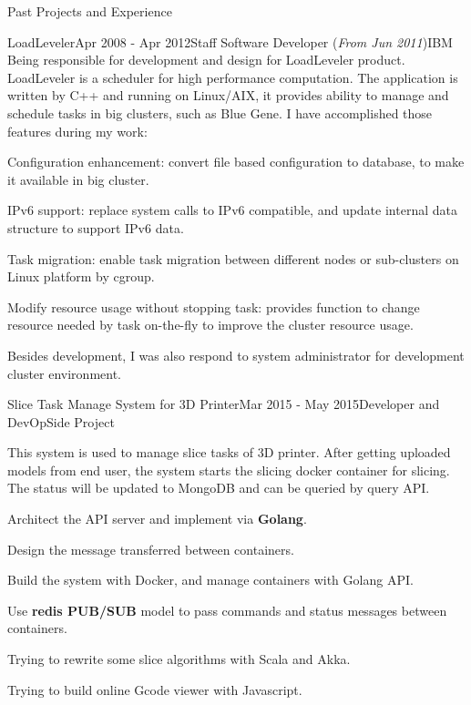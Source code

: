 \documentclass{resume} %
\begin{document}
\begin{rSection}{Past Projects and Experience}
\begin{rSubsection}{LoadLeveler}{Apr 2008 - Apr 2012}{Staff Software Developer (\textit{From Jun 2011})}{IBM}
Being responsible for development and design for LoadLeveler product. LoadLeveler is a scheduler for high performance computation. The application is written by C++ and running on Linux/AIX, it provides ability to manage and schedule tasks in big clusters, such as Blue Gene. I have accomplished those features during my work:

\begin{rSubsectionList}
\item Configuration enhancement: convert file based configuration to database, to make it available in big cluster.
\item IPv6 support: replace system calls to IPv6 compatible, and update internal data structure to support IPv6 data.
\item Task migration: enable task migration between different nodes or sub-clusters on Linux platform by cgroup.
\item Modify resource usage without stopping task: provides function to change resource needed by task on-the-fly to improve the cluster resource usage.
\end{rSubsectionList}\vspace{-1.5em}

Besides development, I was also respond to system administrator for development cluster environment.
\end{rSubsection}
\vspace{1.8em}



\begin{rSubsection}{Slice Task Manage System for 3D Printer}{Mar 2015 - May 2015}{Developer and DevOp}{Side Project}

This system is used to manage slice tasks of 3D printer. After getting uploaded models from end user, the system starts the slicing docker container for slicing. The status will be updated to MongoDB and can be queried by query API.

\begin{rSubsectionList}
\item Architect the API server and implement via { \bf Golang}.
\item Design the message transferred between containers.
\item Build the system with Docker, and manage containers with Golang API.
\item Use { \bf redis PUB/SUB } model to pass commands and status messages between containers.
\item Trying to rewrite some slice algorithms with Scala and Akka.
\item Trying to build online Gcode viewer with Javascript.
\end{rSubsectionList}
\end{rSubsection}



\end{rSection}
\end{document}
